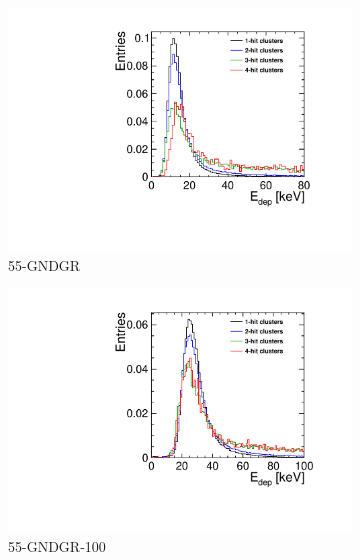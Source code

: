 \begin{figure}[htbp] \centering
  \begin{subfigure}[b]{0.33\textwidth}
    \includegraphics[width=\textwidth]{./figures/Calibration/Edep_Clusters_W0019_G07.pdf}
    \caption{55-GNDGR}
  \end{subfigure} \hfill
  \begin{subfigure}[b]{0.33\textwidth}
    \includegraphics[width=\textwidth]{./figures/Calibration/Edep_Clusters_W0005_E02.pdf}
    \caption{55-GNDGR-100}
  \end{subfigure}\hfill
  \begin{subfigure}[b]{0.33\textwidth}

\end{subfigure}
\end{figure}
